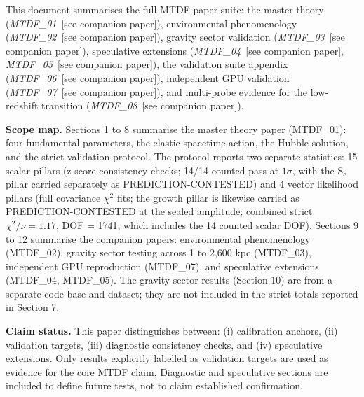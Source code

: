 \documentclass[11pt,a4paper]{article}
\begin{document}
\begin{mdframed}
This document summarises the full MTDF paper suite: the master theory (\textit{MTDF\_\allowbreak{}01}~[see companion paper]), environmental phenomenology (\textit{MTDF\_\allowbreak{}02}~[see companion paper]), gravity sector validation (\textit{MTDF\_\allowbreak{}03}~[see companion paper]), speculative extensions (\textit{MTDF\_\allowbreak{}04}~[see companion paper], \textit{MTDF\_\allowbreak{}05}~[see companion paper]), the validation suite appendix (\textit{MTDF\_\allowbreak{}06}~[see companion paper]), independent GPU validation (\textit{MTDF\_\allowbreak{}07}~[see companion paper]), and multi-probe evidence for the low-redshift transition (\textit{MTDF\_\allowbreak{}08}~[see companion paper]).
\end{mdframed}

\begin{mdframed}[linecolor=accent,linewidth=0.5pt,backgroundcolor=callout-bg,leftline=true,rightline=true,topline=true,bottomline=true,innerleftmargin=8pt,innerrightmargin=8pt,innertopmargin=6pt,innerbottommargin=6pt]
\textbf{Scope map.} Sections 1 to 8 summarise the master theory paper (MTDF\_\allowbreak{}01): four fundamental parameters, the elastic spacetime action, the Hubble solution, and the strict validation protocol. The protocol reports two separate statistics: 15 scalar pillars (z-score consistency checks; 14/\allowbreak{}14 counted pass at $1\sigma$, with the S$_8$ pillar carried separately as PREDICTION-CONTESTED) and 4 vector likelihood pillars (full covariance $\chi^2$ fits; the growth pillar is likewise carried as PREDICTION-CONTESTED at the sealed amplitude; combined strict $\chi^2/\nu = 1.17$, DOF = 1741, which includes the 14 counted scalar DOF). Sections 9 to 12 summarise the companion papers: environmental phenomenology (MTDF\_\allowbreak{}02), gravity sector testing across 1 to 2,600 kpc (MTDF\_\allowbreak{}03), independent GPU reproduction (MTDF\_\allowbreak{}07), and speculative extensions (MTDF\_\allowbreak{}04, MTDF\_\allowbreak{}05). The gravity sector results (Section 10) are from a separate code base and dataset; they are not included in the strict totals reported in Section 7.
\end{mdframed}

\tableofcontents

\begin{mdframed}[linecolor=accent,linewidth=0.5pt,backgroundcolor=callout-bg,leftline=true,rightline=true,topline=true,bottomline=true,innerleftmargin=8pt,innerrightmargin=8pt,innertopmargin=6pt,innerbottommargin=6pt]
\textbf{Claim status.}
This paper distinguishes between:
(i) calibration anchors,
(ii) validation targets,
(iii) diagnostic consistency checks, and
(iv) speculative extensions.
Only results explicitly labelled as validation targets are used as evidence for the core MTDF claim. Diagnostic and speculative sections are included to define future tests, not to claim established confirmation.
\end{mdframed}
\end{document}
